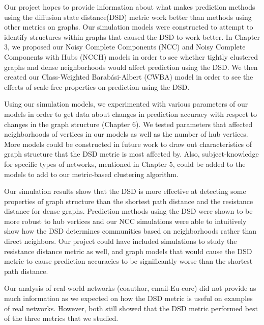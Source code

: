 Our project hopes to provide information about what makes prediction methods using the diffusion state distance(DSD) metric work better than methods using other metrics on graphs. Our simulation models were constructed to attempt to identify structures within graphs that caused the DSD to work better. In Chapter 3, we proposed our Noisy Complete Components (NCC) and Noisy Complete Components with Hubs (NCCH) models in order to see whether tightly clustered graphs and dense neighborhoods would affect prediction using the DSD. We then created our Class-Weighted Barab\'{a}si-Albert (CWBA) model in order to see the effects of scale-free properties on prediction using the DSD.

Using our simulation models, we experimented with various parameters of our models in order to get data about changes in prediction accuracy with respect to changes in the graph structure (Chapter 6). We tested parameters that affected neighborhoods of vertices in our models as well as the number of hub vertices. More models could be constructed in future work to draw out characteristics of graph structure that the DSD metric is most affected by. Also, subject-knowledge for specific types of networks, mentioned in Chapter 5, could be added to the models to add to our metric-based clustering algorithm.

Our simulation results show that the DSD is more effective at detecting some 
properties of graph structure than the shortest path distance and the
resistance distance for dense graphs. Prediction methods using the DSD were 
shown to be more robust to hub vertices and our NCC simulations were able to
intuitively show how the DSD determines communities based on neighborhoods 
rather than direct neighbors. Our project could have included simulations to
study the resistance distance metric as well, and graph models that would
cause the DSD metric to cause prediction accuracies to be significantly 
worse than the shortest path distance.

Our analysis of real-world networks (coauthor, email-Eu-core) did not provide
as much information as we expected on how the DSD metric is useful on examples
of real networks. However, both still showed that the DSD metric performed
best of the three metrics that we studied.

